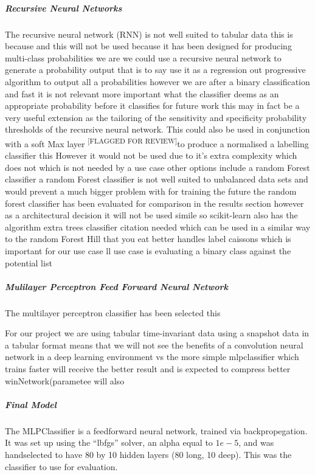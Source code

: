 \documentclass{UoNMCHA}
\newcommand{\flagforreview}{\textsuperscript{\color{red} [FLAGGED FOR REVIEW]}}
\newcommand{\inlineQuote}[1]{``#1''}
\numberwithin{equation}{section}
\begin{document}
\subparagraph{Recursive Neural Networks}
The recursive neural network (RNN) is not well suited to tabular data this is because and this will not be used because it has been designed for producing multi-class probabilities we are we could use a recursive neural network to generate a probability output that is to say use it as a regression out progressive algorithm to output all a probabilities however we are after a binary classification and fast it is not relevant more important what the classifier deems as an appropriate probability before it classifies for future work this may in fact be a very useful extension as the tailoring of the sensitivity and specificity probability thresholds of the recursive neural network. This could also be used in conjunction with a soft Max layer\flagforreview to produce a normalised a labelling classifier this
However it would not be used due to it's extra complexity which does not which is not needed by a use case other options include a random Forest classifier a random Forest classifier is not well suited to unbalanced data sets and would prevent a much bigger problem with for training the future the random forest classifier has been evaluated for comparison in the results section however as a architectural decision it will not be used simile so scikit-learn also has the algorithm extra trees classifier citation needed which can be used in a similar way to the random Forest Hill that you eat better handles label caissons which is important for our use case ll use case is evaluating a binary class against the potential list

\subparagraph{Mulilayer Perceptron Feed Forward Neural Network}
The multilayer perceptron classifier has been selected this

For our project we are using tabular time-invariant data using a snapshot data in a tabular format means that we will not see the benefits of a convolution neural network in a deep learning environment vs the more simple mlpclassifier which trains faster will receive the better result and is expected to compress better winNetwork(parametee will also

\subparagraph{Final Model}
The MLPClassifier is a feedforward neural network, trained via backpropegation. It was set up using the \inlineQuote{lbfgs} solver, an alpha equal to $1e-5$, and was handselected to have 80 by 10 hidden layers (80 long, 10 deep). This was the classifier to use for evaluation.

\end{document}
